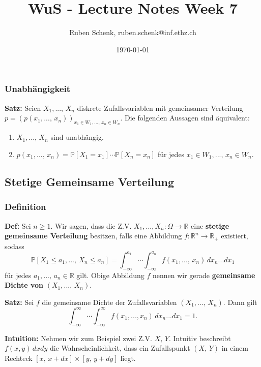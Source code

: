 \documentclass[a4paper]{extarticle}
\title{WuS - Lecture Notes Week 7}
\author{Ruben Schenk, ruben.schenk@inf.ethz.ch}
\date{\today}
\begin{document}
\maketitle

\subsubsection{Unabhängigkeit}

\begin{cbox}
    \textbf{Satz:} Seien $X_1,..., \, X_n$ diskrete Zufallsvariablen mit gemeinsamer Verteilung $p = (p(x_1,..., \, x_n))_{x_1 \in W_1,..., \, x_n \in W_n}$. Die folgenden Aussagen sind äquivalent:

    \begin{enumerate}
        \item $X_1,..., \, X_n$ sind unabhängig.
        \item $p(x_1,..., \, x_n) = \mathbb{P}[X_1 = x_1] \cdots \mathbb{P}[X_n = x_n]$ für jedes $x_1 \in W_1,..., \, x_n \in W_n$.
    \end{enumerate}
\end{cbox}

\subsection{Stetige Gemeinsame Verteilung}

\subsubsection{Definition}

\textbf{Def:} Sei $n \geq 1$. Wir sagen, dass die Z.V. $X_1,...,X_n : \Omega \to \mathbb{R}$ eine \textbf{stetige gemeinsame Verteilung} besitzen, falls eine Abbildung $f : \mathbb{R}^n \to \mathbb{R}_+$ existiert, sodass
\[
    \mathbb{P}[X_1 \leq a_1,..., \, X_n \leq a_n] = \int_{- \infty}^{a_1} \cdots \int_{-\infty}^{a_n} f(x_1,..., \, x_n) \, dx_n ... dx_1
\]
für jedes $a_1,..., \, a_n \in \mathbb{R}$ gilt. Obige Abbildung $f$ nennen wir gerade \textbf{gemeinsame Dichte von} $(X_1,..., \, X_n)$.

\begin{cbox}
    \textbf{Satz:} Sei $f$ die gemeinsame Dichte der Zufallsvariablen $(X_1,..., \, X_n)$. Dann gilt
    \[
        \int_{- \infty}^{\infty} \cdots \int_{ - \infty}^{\infty} f(x_1,...,x_n) \, dx_n ... dx_1 = 1.
    \]
\end{cbox}

\begin{ebox}
    \textbf{Intuition:} Nehmen wir zum Beispiel zwei Z.V. $X, \, Y$. Intuitiv beschreibt $f(x,y) \, dxdy$ die Wahrscheinlichkeit, dass ein Zufallspunkt $(X, \, Y)$ in einem Rechteck $[x, \, x + dx] \times [y, \, y + dy]$ liegt.
\end{ebox}
\end{document}
